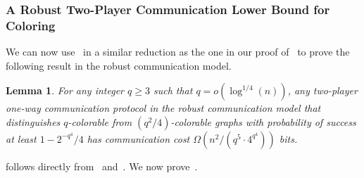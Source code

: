 \documentclass[11pt]{article}
\newtheorem{lemma}{Lemma}[section]
\theoremstyle{definition}
\renewcommand{\geq}{\geqslant}
\begin{document}
\subsubsection{A Robust Two-Player Communication Lower Bound for Coloring}\label{sec:robust-coloring} 

We can now use~ in a similar reduction as the one in our proof of~ to prove the following result 
in the robust communication model. 

\begin{lemma}\label{lem:two-player-robust}
	For any integer $q\geq 3$ such that $q = o(\log^{1/4}(n))$, any two-player one-way communication protocol in the robust communication model that distinguishes $q$-colorable from $(q^2/4)$-colorable graphs with probability of success at least
	$1-2^{-q^4}/4$ has communication cost $\Omega(n^2/(q^5 \cdot 4^{q^4}))$ bits. 
\end{lemma}

 follows directly from~ and~. We now prove~.
\end{document}
